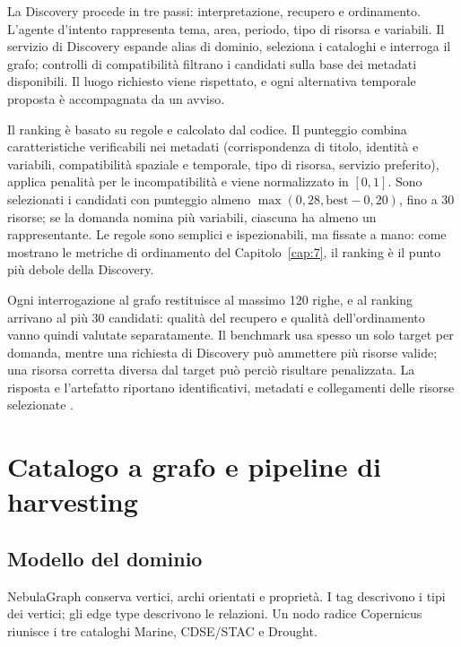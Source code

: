 La Discovery procede in tre passi: interpretazione, recupero e ordinamento.
L'agente d'intento rappresenta tema, area, periodo, tipo di risorsa e
variabili. Il servizio di Discovery espande alias di dominio, seleziona i
cataloghi e interroga il grafo; controlli di compatibilità filtrano i
candidati sulla base dei metadati disponibili. Il luogo richiesto viene
rispettato, e ogni alternativa temporale proposta è accompagnata da un avviso.

Il ranking è basato su regole e calcolato dal codice. Il punteggio combina
caratteristiche verificabili nei metadati (corrispondenza di titolo, identità e
variabili, compatibilità spaziale e temporale, tipo di risorsa, servizio
preferito), applica penalità per le incompatibilità e viene normalizzato in
$[0,1]$. Sono selezionati i candidati con punteggio almeno
$\max(0{,}28,\mathrm{best}-0{,}20)$, fino a 30 risorse; se la domanda nomina più
variabili, ciascuna ha almeno un rappresentante. Le regole sono semplici e
ispezionabili, ma fissate a mano: come mostrano le metriche di ordinamento del
Capitolo~\ref{cap:7}, il ranking è il punto più debole della Discovery.

Ogni interrogazione al grafo restituisce al massimo 120 righe, e al ranking
arrivano al più 30 candidati: qualità del recupero e qualità dell'ordinamento
vanno quindi valutate separatamente. Il benchmark usa spesso un solo target per
domanda, mentre una richiesta di Discovery può ammettere più risorse valide;
una risorsa corretta diversa dal target può perciò risultare penalizzata. La
risposta e l'artefatto riportano identificativi, metadati e collegamenti delle
risorse selezionate \cite{guidaProgetto2026}.

\section{Catalogo a grafo e pipeline di harvesting}
\label{sec:catalogo-grafo}

\subsection{Modello del dominio}

NebulaGraph conserva vertici, archi orientati e proprietà. I tag descrivono i
tipi dei vertici; gli edge type descrivono le relazioni. Un nodo radice
Copernicus riunisce i tre cataloghi Marine, CDSE/STAC e Drought.

